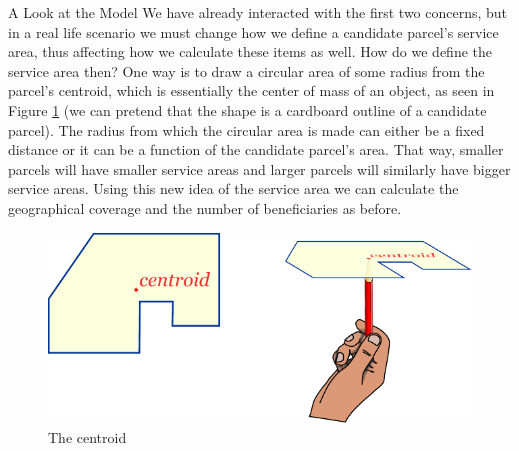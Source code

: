 \documentclass[12pt]{pom_thesis}
\theoremstyle{definition}
\begin{document}
\begin{chapter}{A Look at the Model}
We have already interacted with the first two concerns, but in a real life scenario we must change how we define a candidate parcel's service area, thus affecting how we calculate these items as well. How do we define the service area then? One way is to draw a circular area of some radius from the parcel's centroid, which is essentially the center of mass of an object, as seen in Figure \ref{centroid} (we can pretend that the shape is a cardboard outline of a candidate parcel). The radius from which the circular area is made can either be a fixed distance or it can be a function of the candidate parcel's area. That way, smaller parcels will have smaller service areas and larger parcels will similarly have bigger service areas. Using this new idea of the service area we can calculate the geographical coverage and the number of beneficiaries as before. 
\begin{figure}
\includegraphics{centroid}
\caption{The centroid}
\label{centroid}
\end{figure}


\end{chapter}
\end{document}

